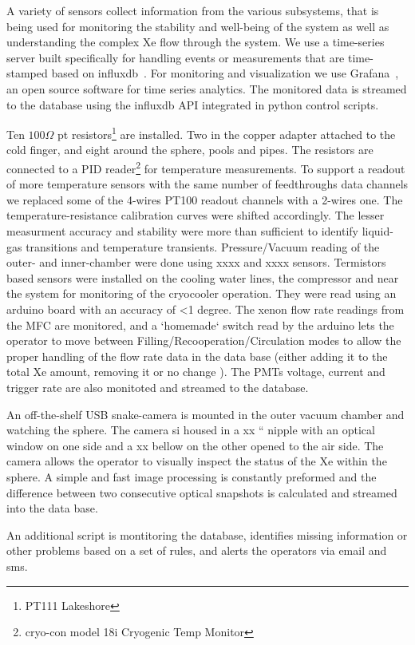 

A variety of sensors collect information from the various subsystems, that is being used for monitoring the stability and well-being of the system as well as understanding the complex Xe flow through the system.  
We use a time-series server built specifically for handling events or measurements that are time-stamped based on influxdb~\cite{INFLUXDB}.
For monitoring and visualization we use Grafana~\cite{GRAFANA}, an open source software for time series analytics.
The monitored data is streamed to the database using the influxdb API integrated in python control scripts.


Ten $100\Omega$ pt resistors\footnote{PT111 Lakeshore}  are installed. Two in the copper adapter attached to the cold finger, and eight around the sphere, pools and pipes. The resistors are connected to a PID reader\footnote{cryo-con model 18i Cryogenic Temp Monitor} for temperature measurements.  To support a readout of more temperature sensors with the same number of feedthroughs data channels we replaced some of the 4-wires PT100 readout channels with a 2-wires one. The temperature-resistance calibration curves were shifted accordingly. The lesser measurment accuracy and stability were more than sufficient to identify liquid-gas transitions and temperature transients.
Pressure/Vacuum reading of the outer- and inner-chamber were done using xxxx and xxxx sensors. 
Termistors based sensors were installed on the cooling water lines, the compressor and near the system for monitoring of the cryocooler operation. They were read using an arduino board with an accuracy of <1 degree.   
The xenon flow rate readings from the MFC are monitored, and a `homemade` switch read by the arduino lets the operator to move between Filling/Recooperation/Circulation modes to allow the proper handling of the flow rate data in the data base (either adding it to the total Xe amount, removing it or no change ).
The PMTs voltage, current and trigger rate are also monitoted and streamed to the database. 

An off-the-shelf USB snake-camera is mounted in the outer vacuum chamber and watching the sphere. The camera si housed in a xx `` nipple with an optical window on one side and a xx bellow on the other opened to the air side. The camera allows the operator to visually inspect the status of the Xe within the sphere. A simple and fast image processing is constantly preformed and the difference between two consecutive optical snapshots is calculated and streamed into the data base.

An additional script is montitoring the database, identifies missing information or other problems based on a set of rules, and alerts the operators via email and sms.




